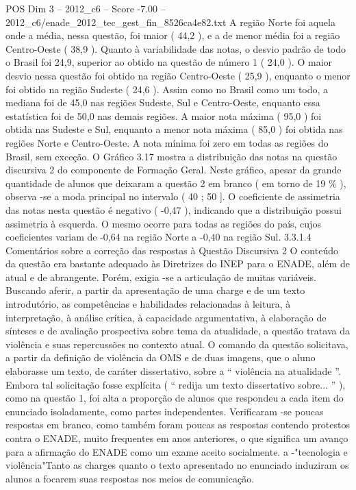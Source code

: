 \begin{textsample}{POS Dim 3 – 2012\_c6 – Score -7.00 – 2012\_c6/enade\_2012\_tec\_gest\_fin\_8526ca4e82.txt}
A região Norte foi aquela onde a média, nessa questão, foi maior ( 44,2 ), e a de menor média foi a região Centro-Oeste ( 38,9 ).
Quanto à variabilidade das notas, o desvio padrão de todo o Brasil foi 24,9, superior ao obtido na questão de número 1 ( 24,0 ).
O maior desvio nessa questão foi obtido na região Centro-Oeste ( 25,9 ), enquanto o menor foi obtido na região Sudeste ( 24,6 ).
Assim como no Brasil como um todo, a mediana foi de 45,0 nas regiões Sudeste, Sul e Centro-Oeste, enquanto essa estatística foi de 50,0 nas demais regiões.
A maior nota máxima ( 95,0 ) foi obtida nas Sudeste e Sul, enquanto a menor nota máxima ( 85,0 ) foi obtida nas regiões Norte e Centro-Oeste.
A nota mínima foi zero em todas as regiões do Brasil, sem exceção.
O Gráfico 3.17 mostra a distribuição das notas na questão discursiva 2 do componente de Formação Geral.
Neste gráfico, apesar da grande quantidade de alunos que deixaram a questão 2 em branco ( em torno de 19 \% ), observa -se a moda principal no intervalo ( 40 ; 50 ].
O coeficiente de assimetria das notas nesta questão é negativo ( -0,47 ), indicando que a distribuição possui assimetria à esquerda.
O mesmo ocorre para todas as regiões do país, cujos coeficientes variam de -0,64 na região Norte a -0,40 na região Sul. 3.3.1.4 Comentários sobre a correção das respostas à Questão Discursiva 2 O conteúdo da questão era bastante adequado às Diretrizes do INEP para o ENADE, além de atual e de abrangente.
Porém, exigia -se a articulação de muitas variáveis.
Buscando aferir, a partir da apresentação de uma charge e de um texto introdutório, as competências e habilidades relacionadas à leitura, à interpretação, à análise crítica, à capacidade argumentativa, à elaboração de sínteses e de avaliação prospectiva sobre tema da atualidade, a questão tratava da violência e suas repercussões no contexto atual.
O comando da questão solicitava, a partir da definição de violência da OMS e de duas imagens, que o aluno elaborasse um texto, de caráter dissertativo, sobre a “ violência na atualidade ”.
Embora tal solicitação fosse explícita ( “ redija um texto dissertativo sobre... ” ), como na questão 1, foi alta a proporção de alunos que respondeu a cada item do enunciado isoladamente, como partes independentes.
Verificaram -se poucas respostas em branco, como também foram poucas as respostas contendo protestos contra o ENADE, muito frequentes em anos anteriores, o que significa um avanço para a afirmação do ENADE como um exame aceito socialmente. a -"tecnologia e violência"Tanto as charges quanto o texto apresentado no enunciado induziram os alunos a focarem suas respostas nos meios de comunicação.

\end{textsample}
